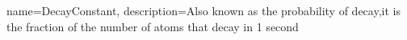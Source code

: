 {
    name=DecayConstant,
    description={Also known as the probability of decay,it is the fraction of the number of atoms that decay in 1 second}
} 
